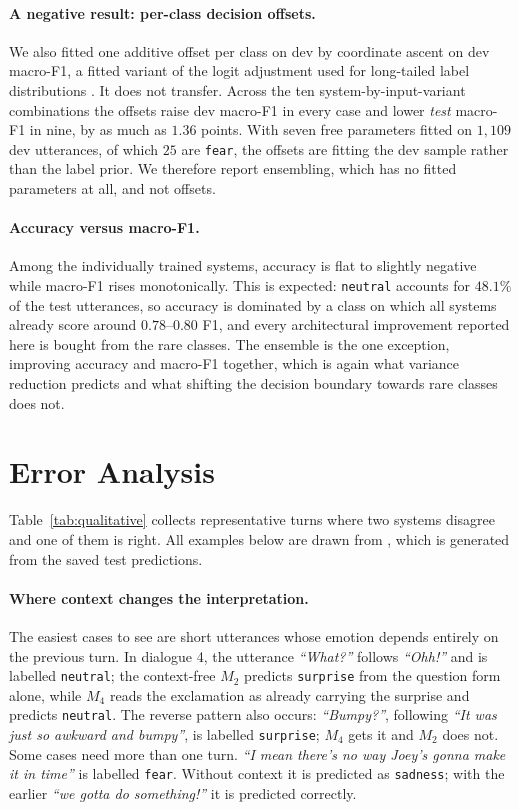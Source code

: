 \documentclass[sigconf,nonacm]{acmart}
\begin{document}
\paragraph{A negative result: per-class decision offsets.}
We also fitted one additive offset per class on dev by coordinate ascent on dev macro-F1,
a fitted variant of the logit adjustment used for long-tailed label distributions
\citep{menon2020logit}. It does not transfer. Across the ten
system-by-input-variant combinations the offsets raise dev macro-F1 in every case and lower
\emph{test} macro-F1 in nine, by as much as $1.36$ points. With seven free parameters fitted
on $1{,}109$ dev utterances, of which $25$ are \texttt{fear}, the offsets are fitting the dev
sample rather than the label prior. We therefore report ensembling, which has no fitted
parameters at all, and not offsets.

\paragraph{Accuracy versus macro-F1.}
Among the individually trained systems, accuracy is flat to slightly negative while macro-F1
rises monotonically. This is expected: \texttt{neutral} accounts for
$48.1\%$ of the test utterances, so accuracy is dominated by a class on which all systems
already score around $0.78$--$0.80$ F1, and every architectural improvement reported here is
bought from the rare classes. The ensemble is the one exception, improving accuracy and
macro-F1 together, which is again what variance reduction predicts and what shifting the
decision boundary towards rare classes does not.

\section{Error Analysis}



Table~\ref{tab:qualitative} collects representative turns where two systems disagree and
one of them is right. All examples below are drawn from , which is
generated from the saved test predictions.

\paragraph{Where context changes the interpretation.}
The easiest cases to see are short utterances whose emotion depends entirely on the
previous turn. In dialogue 4, the utterance \emph{``What?''} follows \emph{``Ohh!''} and is labelled
\texttt{neutral}; the context-free $M_2$ predicts \texttt{surprise} from the question form
alone, while $M_4$ reads the exclamation as already carrying the surprise and predicts
\texttt{neutral}. The reverse pattern also occurs: \emph{``Bumpy?''}, following
\emph{``It was just so awkward and bumpy''}, is labelled \texttt{surprise}; $M_4$ gets it
and $M_2$ does not. Some cases need more than one turn. \emph{``I mean there's no way
Joey's gonna make it in time''} is labelled \texttt{fear}. Without context it is predicted
as \texttt{sadness}; with the earlier \emph{``we gotta do something!''} it is predicted
correctly.
\end{document}

